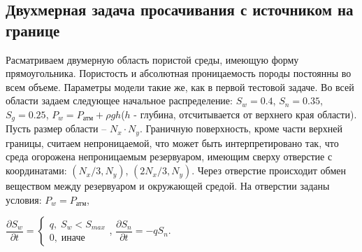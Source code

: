 \subsection{Двухмерная задача просачивания с источником на границе}
Расматриваем двумерную область пористой среды, имеющую форму
прямоугольника. Пористость и абсолютная проницаемость породы постоянны во всем
объеме. Параметры модели такие же, как
в первой тестовой задаче.
Во всей области задаем следующее 
начальное распределение: $S_w=0.4$,\; $S_n=0.35$,\; $S_g=0.25$, 
$P_w=P_\text{атм}+\rho g h$($h$ - глубина, отсчитывается от верхнего края области).
Пусть размер области -- $N_x\cdot N_y$.
Граничную поверхность, кроме части верхней границы, считаем непроницаемой, 
что может быть интерпретировано так,
что среда огорожена непроницаемым резервуаром, имеющим сверху отверстие с
координатами: $(N_x/3, N_y)$, $(2N_x/3, N_y)$. Через отверстие происходит обмен веществом между 
резервуаром и окружающей средой. На отверстии заданы условия: $P_w=P_\text{атм}$,

$ \dfrac{\partial S_w}{\partial t}= 
\begin{cases}
 q, \; S_w<S_{max}\\
 0, \; \text{иначе}
\end{cases}
$,
$ \dfrac{\partial S_n}{\partial t}=-q S_n$.

